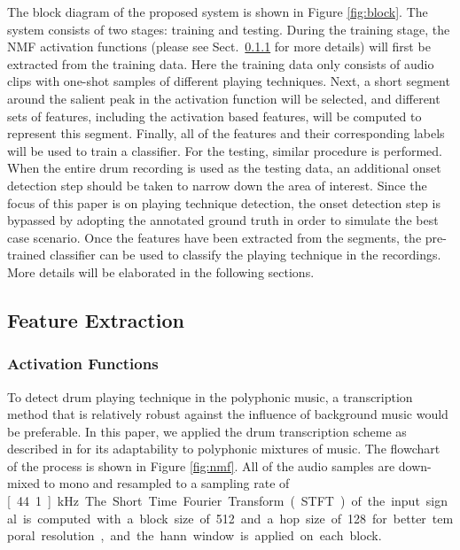 \documentclass{article}
\begin{document}
{{{{{The block diagram of the proposed system is shown in Figure \ref{fig:block}. The system consists of two stages: training and testing. During the training stage, the NMF activation functions (please see Sect.~\ref{sssec:activ} for more details) will first be extracted from the training data. Here the training data only consists of audio clips with one-shot samples of different playing techniques. Next, a short segment around the salient peak in the activation function will be selected, and different sets of features, including the activation based features, will be computed to represent this segment. Finally, all of the features and their corresponding labels will be used to train a classifier. For the testing, similar procedure is performed. When the entire drum recording is used as the testing data, an additional onset detection step should be taken to narrow down the area of interest. Since the focus of this paper is on playing technique detection, the onset detection step is bypassed by adopting the annotated ground truth in order to simulate the best case scenario. Once the features have been extracted from the segments, the pre-trained classifier can be used to classify the playing technique in the recordings. More details will be elaborated in the following sections. 
 
\subsection{Feature Extraction}\label{ssec:featuresExtract}
\subsubsection{Activation Functions}
\label{sssec:activ}

To detect drum playing technique in the polyphonic music, a transcription method that is relatively robust against the influence of background music would be preferable. In this paper, we applied the drum transcription scheme as described in \cite{Wu2015a} for its adaptability to polyphonic mixtures of music. The flowchart of the process is shown in Figure \ref{fig:nmf}. All of the audio samples are down-mixed to mono and resampled to a sampling rate of \unit[44.1]{kHz}. The Short Time Fourier Transform (STFT) of the input signal is computed with a block size of 512 and a hop size of 128 for better temporal resolution, and the hann window is applied on each block. 

}}}}}
\end{document}
